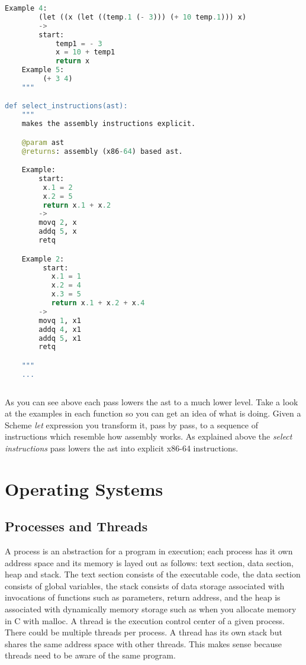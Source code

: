 \documentclass[10pt]{article}
\begin{document}
\begin{lstlisting}[language=python]
    Example 4:
        (let ((x (let ((temp.1 (- 3))) (+ 10 temp.1))) x)
        ->
        start:
            temp1 = - 3
            x = 10 + temp1
            return x
    Example 5:
         (+ 3 4)
    """

def select_instructions(ast):
    """
    makes the assembly instructions explicit.

    @param ast
    @returns: assembly (x86-64) based ast.

    Example:
        start:
         x.1 = 2
         x.2 = 5
         return x.1 + x.2
        ->
        movq 2, x
        addq 5, x
        retq

    Example 2:
         start:
           x.1 = 1
           x.2 = 4
           x.3 = 5
           return x.1 + x.2 + x.4
        ->
        movq 1, x1
        addq 4, x1
        addq 5, x1
        retq

    """
    ...
    
\end{lstlisting}
As you can see above each pass lowers the ast to a much lower level. Take a look at the examples in each function so you can get an idea of what is doing. Given a Scheme \textit{let} expression you transform it, pass by pass, to a sequence of instructions which resemble how assembly works. As explained above the \textit{select instructions} pass lowers the ast into explicit x86-64 instructions.

\section{Operating Systems}

\subsection{Processes and Threads}
A process is an abstraction for a program in execution; each process has it own address space and its memory is layed out as follows: text section, data section, heap and stack. The text section consists of the executable code, the data section consists of global variables, the stack consists of data storage associated with invocations of functions such as parameters, return address, and the heap is associated with dynamically memory storage such as when you allocate memory in C with malloc. A thread is the execution control center of a given process. There could be multiple threads per process. A thread has its own stack but shares the same address space with other threads. This makes sense because threads need to be aware of the same program.
\end{document}

